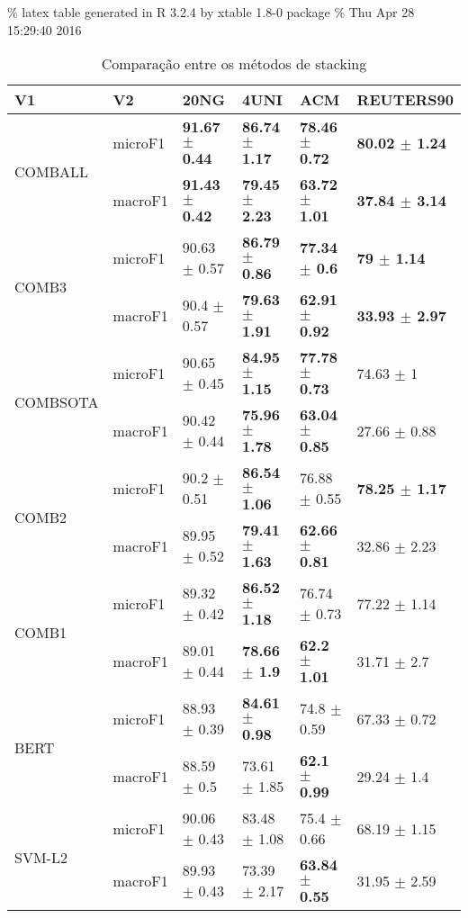 \documentclass[]{article}
\begin{document}
\% latex table generated in R 3.2.4 by xtable 1.8-0 package \% Thu Apr
28 15:29:40 2016

\begin{table}[ht]
\centering
\begin{tabular}{llllll}
  \hline
V1 & V2 & 20NG & 4UNI & ACM & REUTERS90 \\ 
  \cline{3-6} \hline
\multirow{2}{*}{COMBALL} & microF1 & \bf{91.67 $\pm$  0.44} & \bf{86.74 $\pm$  1.17} & \bf{78.46 $\pm$  0.72} & \bf{80.02 $\pm$  1.24} \\ 
   & macroF1 & \bf{91.43 $\pm$  0.42} & \bf{79.45 $\pm$  2.23} & \bf{63.72 $\pm$  1.01} & \bf{37.84 $\pm$  3.14} \\ 
   \cline{3-6}\multirow{2}{*}{COMB3} & microF1 & 90.63 $\pm$  0.57 & \bf{86.79 $\pm$  0.86} & \bf{77.34 $\pm$  0.6} & \bf{79 $\pm$  1.14} \\ 
   & macroF1 & 90.4 $\pm$  0.57 & \bf{79.63 $\pm$  1.91} & \bf{62.91 $\pm$  0.92} & \bf{33.93 $\pm$  2.97} \\ 
   \cline{3-6}\multirow{2}{*}{COMBSOTA} & microF1 & 90.65 $\pm$  0.45 & \bf{84.95 $\pm$  1.15} & \bf{77.78 $\pm$  0.73} & 74.63 $\pm$  1 \\ 
   & macroF1 & 90.42 $\pm$  0.44 & \bf{75.96 $\pm$  1.78} & \bf{63.04 $\pm$  0.85} & 27.66 $\pm$  0.88 \\ 
   \cline{3-6}\multirow{2}{*}{COMB2} & microF1 & 90.2 $\pm$  0.51 & \bf{86.54 $\pm$  1.06} & 76.88 $\pm$  0.55 & \bf{78.25 $\pm$  1.17} \\ 
   & macroF1 & 89.95 $\pm$  0.52 & \bf{79.41 $\pm$  1.63} & \bf{62.66 $\pm$  0.81} & 32.86 $\pm$  2.23 \\ 
   \cline{3-6}\multirow{2}{*}{COMB1} & microF1 & 89.32 $\pm$  0.42 & \bf{86.52 $\pm$  1.18} & 76.74 $\pm$  0.73 & 77.22 $\pm$  1.14 \\ 
   & macroF1 & 89.01 $\pm$  0.44 & \bf{78.66 $\pm$  1.9} & \bf{62.2 $\pm$  1.01} & 31.71 $\pm$  2.7 \\ 
   \cline{3-6}\multirow{2}{*}{BERT} & microF1 & 88.93 $\pm$  0.39 & \bf{84.61 $\pm$  0.98} & 74.8 $\pm$  0.59 & 67.33 $\pm$  0.72 \\ 
   & macroF1 & 88.59 $\pm$  0.5 & 73.61 $\pm$  1.85 & \bf{62.1 $\pm$  0.99} & 29.24 $\pm$  1.4 \\ 
   \cline{3-6}\multirow{2}{*}{SVM-L2} & microF1 & 90.06 $\pm$  0.43 & 83.48 $\pm$  1.08 & 75.4 $\pm$  0.66 & 68.19 $\pm$  1.15 \\ 
   & macroF1 & 89.93 $\pm$  0.43 & 73.39 $\pm$  2.17 & \bf{63.84 $\pm$  0.55} & 31.95 $\pm$  2.59 \\ 
   \cline{3-6}\end{tabular}
\caption{Comparação entre os métodos de stacking} 
\label{tab:stacking}
\end{table}
\end{document}

